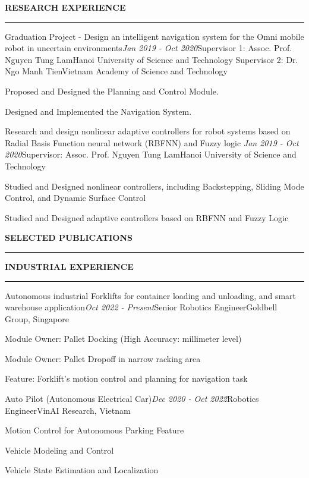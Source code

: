 \documentclass{resume} %
\renewenvironment{rSection}[1]{
\sectionskip
\textbf{\MakeUppercase{{#1}}}
\sectionlineskip
\hrule
\begin{list}{}{
\setlength{\leftmargin}{1.5em}
}
\item[]
}{
\end{list}
}
\begin{document}
\begin{rSection}{Research Experience}
\begin{rSubsection}{Graduation Project - Design an intelligent navigation system for the Omni mobile robot in uncertain environments}{\em Jan 2019 - Oct 2020}{Supervisor 1: Assoc. Prof. Nguyen Tung Lam}{Hanoi University of Science and Technology}
{Supervisor 2: Dr. Ngo Manh Tien}{Vietnam Academy of Science and Technology}
\item Proposed and Designed the Planning and Control Module.
\item Designed and Implemented the Navigation System.
\end{rSubsection}


\begin{rSubsection}{Research and design nonlinear adaptive controllers for robot systems based on Radial Basis Function neural network (RBFNN) and Fuzzy logic \cite{paper5}}{\em Jan 2019 - Oct 2020}{Supervisor: Assoc. Prof.  Nguyen Tung Lam}{Hanoi University of Science and Technology}
{}
{}
\item Studied and Designed nonlinear controllers, including Backstepping, Sliding Mode Control, and Dynamic Surface Control
\item Studied and Designed adaptive controllers based on RBFNN and Fuzzy Logic
\end{rSubsection}
\end{rSection}

\begin{rSection}{Selected Publications}
\leavevmode\printbibliography[heading=none]
\end{rSection}

\begin{rSection}{Industrial Experience}
\begin{rSubsection}{Autonomous industrial Forklifts for container loading and unloading, and smart warehouse application}{\em Oct 2022 - Present}{Senior Robotics Engineer}{Goldbell Group, Singapore}
{}
{}
\item Module Owner: Pallet Docking (High Accuracy: millimeter level)
\item Module Owner: Pallet Dropoff in narrow racking area
\item Feature: Forklift’s motion control and planning for navigation task
\end{rSubsection}

\begin{rSubsection}{Auto Pilot (Autonomous Electrical Car)}{\em Dec 2020 - Oct 2022}{Robotics Engineer}{VinAI Research, Vietnam}
{}
{}
\item Motion Control for Autonomous Parking Feature
\item Vehicle Modeling and Control
\item Vehicle State Estimation and Localization
\end{rSubsection}
\end{rSection}
\end{document}
